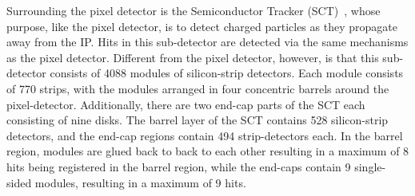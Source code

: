 Surrounding the pixel detector is the Semiconductor Tracker (SCT)~\cite{atlas_sct}, whose purpose, like the pixel detector, is to detect charged particles as they propagate away from the IP\@. Hits in this sub-detector are detected via the same mechanisms as the pixel detector\@. Different from the pixel detector, however, is that this sub-detector consists of 4088 modules of silicon-strip detectors. Each module consists of 770 strips, with the modules arranged in four concentric barrels around the pixel-detector. Additionally, there are two end-cap parts of the SCT each consisting of nine disks. The barrel layer of the SCT contains 528 silicon-strip detectors, and the end-cap regions contain 494 strip-detectors each. In the barrel region, modules are glued back to back to each other resulting in a maximum of 8 hits being registered in the barrel region, while the end-caps contain 9 single-sided modules, resulting in a maximum of 9 hits. 
